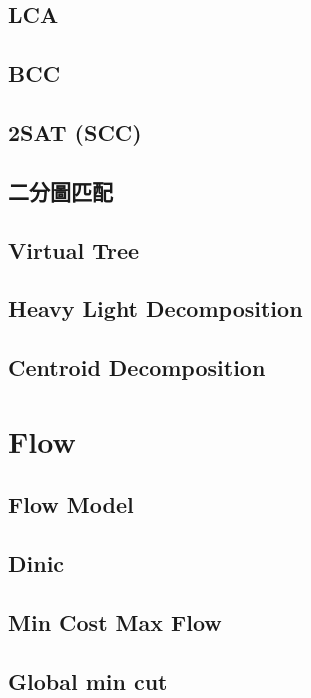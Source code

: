 \subsection{LCA}

\subsection{BCC}

\subsection{2SAT (SCC)}

\subsection{二分圖匹配}

\subsection{Virtual Tree}

\subsection{Heavy Light Decomposition}

\subsection{Centroid Decomposition}


\section{Flow}
\subsection{Flow Model}

\subsection{Dinic}

\subsection{Min Cost Max Flow}

\subsection{Global min cut}

